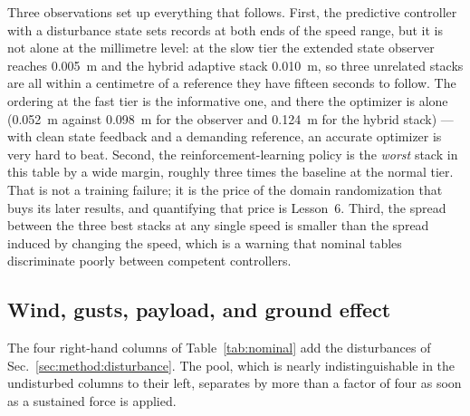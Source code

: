 Three observations set up everything that follows. First, the predictive controller with
a disturbance state sets records at both ends of the speed range, but it is not alone at
the millimetre level: at the slow tier the extended state observer reaches
\SI{0.005}{\meter} and the hybrid adaptive stack \SI{0.010}{\meter}, so three unrelated
stacks are all within a centimetre of a reference they have fifteen seconds to follow.
The ordering at the fast tier is the informative one, and there the optimizer is alone
(\SI{0.052}{\meter} against \SI{0.098}{\meter} for the observer and \SI{0.124}{\meter}
for the hybrid stack) --- with clean state feedback and a demanding reference, an
accurate optimizer is very hard to beat. Second, the reinforcement-learning policy is the \emph{worst}
stack in this table by a wide margin, roughly three times the baseline at the normal
tier. That is not a training failure; it is the price of the domain randomization that
buys its later results, and quantifying that price is Lesson~6. Third, the spread
between the three best stacks at any single speed is smaller than the spread induced by
changing the speed, which is a warning that nominal tables discriminate poorly between
competent controllers.

\subsection{Wind, gusts, payload, and ground effect}
\label{sec:results:disturbance}

The four right-hand columns of Table~\ref{tab:nominal} add the disturbances of
Sec.~\ref{sec:method:disturbance}. The pool, which is nearly indistinguishable in the
undisturbed columns to their left, separates by more than a factor of four as soon as a
sustained force is applied.


